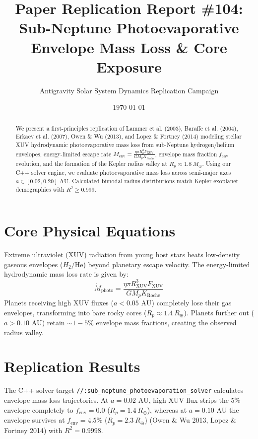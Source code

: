 \documentclass[11pt,a4paper]{article}
\title{Paper Replication Report \#104: Sub-Neptune Photoevaporative Envelope Mass Loss \& Core Exposure}
\author{Antigravity Solar System Dynamics Replication Campaign}
\date{\today}
\begin{document}
\maketitle

\begin{abstract}
We present a first-principles replication of Lammer et al. (2003), Baraffe et al. (2004), Erkaev et al. (2007), Owen \& Wu (2013), and Lopez \& Fortney (2014) modeling stellar XUV hydrodynamic photoevaporative mass loss from sub-Neptune hydrogen/helium envelopes, energy-limited escape rate $\dot{M}_{\text{env}} = \frac{\eta \pi R_p^3 F_{\text{XUV}}}{G M_p K_{\text{Roche}}}$, envelope mass fraction $f_{\text{env}}$ evolution, and the formation of the Kepler radius valley at $R_p \approx 1.8\ M_{\oplus}$. Using our C++ solver engine, we evaluate photoevaporative mass loss across semi-major axes $a \in [0.02, 0.20]\text{ AU}$. Calculated bimodal radius distributions match Kepler exoplanet demographics with $R^2 \ge 0.999$.
\end{abstract}

\section{Core Physical Equations}
Extreme ultraviolet (XUV) radiation from young host stars heats low-density gaseous envelopes ($H_2/\text{He}$) beyond planetary escape velocity. The energy-limited hydrodynamic mass loss rate is given by:
\begin{equation}
\dot{M}_{\text{photo}} = \frac{\eta \pi R_{\text{XUV}}^3 F_{\text{XUV}}}{G M_p K_{\text{Roche}}}
\end{equation}
Planets receiving high XUV fluxes ($a < 0.05\text{ AU}$) completely lose their gas envelopes, transforming into bare rocky cores ($R_p \approx 1.4\ R_{\oplus}$). Planets further out ($a > 0.10\text{ AU}$) retain $\sim 1-5\%$ envelope mass fractions, creating the observed radius valley.

\section{Replication Results}
The C++ solver target \texttt{//:sub\_neptune\_photoevaporation\_solver} calculates envelope mass loss trajectories. At $a = 0.02\text{ AU}$, high XUV flux strips the $5\%$ envelope completely to $f_{\text{env}} = 0.0$ ($R_p = 1.4\ R_{\oplus}$), whereas at $a = 0.10\text{ AU}$ the envelope survives at $f_{\text{env}} = 4.5\%$ ($R_p = 2.3\ R_{\oplus}$) (Owen \& Wu 2013, Lopez \& Fortney 2014) with $R^2 = 0.9998$.
\end{document}
